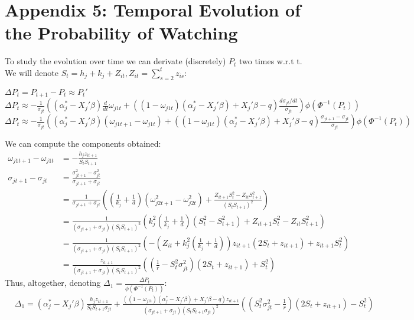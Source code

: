 \section*{Appendix 5: Temporal Evolution of the Probability of Watching}
To study the evolution over time we can derivate (discretely) $P_{t}$ two times w.r.t t. We will denote $S_{t}=h_{j}+k_{j}+Z_{i t}, Z_{i t}=\sum_{s=2}^{t}z_{i s}$:
\begin{center}	
	$\Delta P_{t}=P_{t+1}-P_{t}\approx P_{t}'$\\
	\medskip
	$\Delta P_{t}\approx -\frac{1}{\sigma_{j t}} \left((\alpha_{j}^{*}-X_{j}'\beta)\frac{d}{dt}\omega_{j 1 t}+((1-\omega_{j 1 t}) (\alpha_{j}^{*}-X_{j}'\beta)+X_{j}'\beta-q)\frac{d\sigma_{j t}/dt}{\sigma_{j t}}\right)\phi(\Phi^{-1}(P_{t}))$
	$\Delta P_{t}\approx -\frac{1}{\sigma_{j t}}\left((\alpha_{j}^{*}-X_{j}'\beta)(\omega_{j 1 t+1}-\omega_{j 1 t})+((1-\omega_{j 1 t}) (\alpha_{j}^{*}-X_{j}'\beta)+X_{j}'\beta-q)\frac{\sigma_{j t+1}-\sigma_{j t}}{\sigma_{j t}}\right)\phi(\Phi^{-1}(P_{t}))$
\end{center}	
We can compute the components obtained:
\begin{align*}
	\omega_{j 1 t+1}-\omega_{j 1 t}&=-\frac{h_{j}z_{i t+1}}{S_{t}S_{t+1}}\\
	\sigma_{j t+1}-\sigma_{j t}&=\frac{\sigma_{j t+1}^{2}-\sigma_{j t}^{2}}{\sigma_{j t+1}+\sigma_{j t}}\\
	&=\frac{1}{\sigma_{j t+1}+\sigma_{j t}} \left(\left(\frac{1}{k_{j}}+\frac{1}{d}\right)(\omega_{j 2 t+1}^{2}-\omega_{j 2 t}^{2})+\frac{Z_{i t+1}S_{t}^{2}-Z_{i t}S_{t+1}^{2}}{(S_{t}S_{t+1})^{2}}\right)\\
	&=\frac{1}{(\sigma_{j t+1}+\sigma_{j t})(S_{t}S_{t+1})^{2}}\left(k_{j}^{2}\left(\frac{1}{k_{j}}+\frac{1}{d}\right)(S_{t}^{2}-S_{t+1}^{2})+Z_{i t+1}S_{t}^{2}-Z_{i t}S_{t+1}^{2}\right)\\
	&=\frac{1}{(\sigma_{j t+1}+\sigma_{j t})(S_{t}S_{t+1})^{2}}\left(-\left(Z_{i t}+k_{j}^{2}\left(\frac{1}{k_{j}}+\frac{1}{d}\right)\right)z_{i t+1}(2S_{t}+z_{i t+1})+z_{i t+1}S_{t}^{2}\right)\\
	&=\frac{z_{i t+1}}{(\sigma_{j t+1}+\sigma_{j t})(S_{t}S_{t+1})^{2}}\left(\left(\frac{1}{r}-S_{t}^{2}\sigma_{j t}^{2}\right)(2S_{t}+z_{i t+1})+S_{t}^{2}\right)
\end{align*}	
Thus, altogether, denoting $\Delta_{1}=\frac{\Delta P_{t}}{\phi(\Phi^{-1}(P_{t}))}$:
\begin{align*}
	&\Delta_{1}= (\alpha_{j}^{*}-X_{j}'\beta)\frac{h_{j}z_{i t+1}}{S_{t}S_{t+1}\sigma_{j t}}+\frac{((1-\omega_{j 1 t})(\alpha_{j}^{*}-X_{j}'\beta)+X_{j}'\beta-q)z_{i t+1}}{(\sigma_{j t+1}+\sigma_{j t})(S_{t}S_{t+1}\sigma_{j t})^{2}} \left(\left(S_{t}^{2}\sigma_{j t}^{2}-\frac{1}{r}\right)(2S_{t}+z_{i t+1})-S_{t}^{2}\right)\\
\end{align*}	
